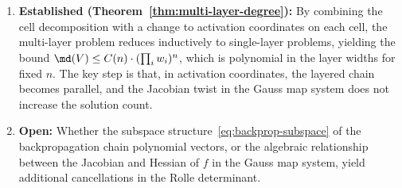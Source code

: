 \begin{enumerate}
  \item \textbf{Established (Theorem~\ref{thm:multi-layer-degree}):} By combining the cell decomposition with a change to activation coordinates on each cell, the multi-layer problem reduces inductively to single-layer problems, yielding the bound $\md(V) \leq C(n)\cdot (\prod_i w_i)^n$, which is polynomial in the layer widths for fixed $n$. The key step is that, in activation coordinates, the layered chain becomes parallel, and the Jacobian twist in the Gauss map system does not increase the solution count.
  \item \textbf{Open:} Whether the subspace structure~\eqref{eq:backprop-subspace} of the backpropagation chain polynomial vectors, or the algebraic relationship between the Jacobian and Hessian of $f$ in the Gauss map system, yield additional cancellations in the Rolle determinant.
\end{enumerate}
